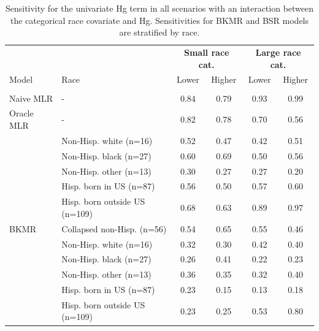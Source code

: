 \documentclass[12pt, twoside]{amherstthesis}
\begin{document}
\begin{table}

\caption{\label{tab:reunivsens}Sensitivity for the univariate Hg term in all scenarios with an interaction between the categorical race covariate and Hg. Sensitivities for BKMR and BSR models are stratified by race.}
\centering
\begin{tabular}[t]{llcccc}
\toprule
\multicolumn{2}{c}{\textbf{ }} & \multicolumn{2}{c}{\textbf{Small race cat.}} & \multicolumn{2}{c}{\textbf{Large race cat.}} \\
\cmidrule(l{3pt}r{3pt}){3-4} \cmidrule(l{3pt}r{3pt}){5-6}
Model & Race & Lower & Higher & Lower & Higher\\
\midrule
\addlinespace[0.3em]
\multicolumn{6}{l}{\textbf{Small}}\\
\hspace{1em}Naive MLR & - & 0.84 & 0.79 & 0.93 & 0.99\\
\addlinespace
\hspace{1em}Oracle MLR & - & 0.82 & 0.78 & 0.70 & 0.56\\
\addlinespace
 & Non-Hisp. white (n=16) & 0.52 & 0.47 & 0.42 & 0.51\\

 & Non-Hisp. black (n=27) & 0.60 & 0.69 & 0.50 & 0.56\\

 & Non-Hisp. other (n=13) & 0.30 & 0.27 & 0.27 & 0.20\\

 & Hisp. born in US (n=87) & 0.56 & 0.50 & 0.57 & 0.60\\

 & Hisp. born outside US (n=109) & 0.68 & 0.63 & 0.89 & 0.97\\

\multirow{-6}{*}{\raggedright\arraybackslash \hspace{1em}BKMR} & Collapsed non-Hisp. (n=56) & 0.54 & 0.65 & 0.55 & 0.46\\
\addlinespace
 & Non-Hisp. white (n=16) & 0.32 & 0.30 & 0.42 & 0.40\\

 & Non-Hisp. black (n=27) & 0.26 & 0.41 & 0.22 & 0.23\\

 & Non-Hisp. other (n=13) & 0.36 & 0.35 & 0.32 & 0.40\\

 & Hisp. born in US (n=87) & 0.23 & 0.15 & 0.13 & 0.18\\

 & Hisp. born outside US (n=109) & 0.23 & 0.25 & 0.53 & 0.80\\


\end{tabular}
\end{table}
\end{document}
